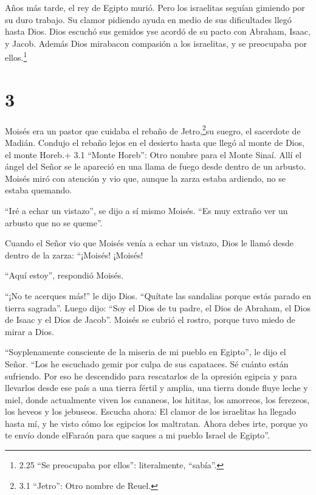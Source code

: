  Años más tarde, el rey de Egipto murió. Pero los
israelitas seguían gimiendo por su duro trabajo. Su clamor pidiendo
ayuda en medio de sus dificultades llegó hasta Dios.  Dios
escuchó sus gemidos yse acordó de su pacto con Abraham, Isaac, y Jacob.
 Además Dios mirabacon compasión a los israelitas, y se
preocupaba por ellos.\footnote{2.25 ``Se preocupaba por ellos'':
  literalmente, ``sabía''.}

\hypertarget{section-2}{%
\section{3}\label{section-2}}

 Moisés era un pastor que cuidaba el rebaño de
Jetro,\footnote{3.1 ``Jetro'': Otro nombre de Reuel.}su suegro, el
sacerdote de Madián. Condujo el rebaño lejos en el desierto hasta que
llegó al monte de Dios, el monte Horeb.+ 3.1 ``Monte Horeb'': Otro
nombre para el Monte Sinaí.  Allí el ángel del Señor se le
apareció en una llama de fuego desde dentro de un arbusto. Moisés miró
con atención y vio que, aunque la zarza estaba ardiendo, no se estaba
quemando.

 ``Iré a echar un vistazo'', se dijo a sí mismo Moisés. ``Es
muy extraño ver un arbusto que no se queme''.

 Cuando el Señor vio que Moisés venía a echar un vistazo,
Dios le llamó desde dentro de la zarza: ``¡Moisés! ¡Moisés!

``Aquí estoy'', respondió Moisés.

 ``¡No te acerques más!'' le dijo Dios. ``Quítate las
sandalias porque estás parado en tierra sagrada''.  Luego
dijo: ``Soy el Dios de tu padre, el Dios de Abraham, el Dios de Isaac y
el Dios de Jacob''. Moisés se cubrió el rostro, porque tuvo miedo de
mirar a Dios.

 ``Soyplenamente consciente de la miseria de mi pueblo en
Egipto'', le dijo el Señor. ``Los he escuchado gemir por culpa de sus
capataces. Sé cuánto están sufriendo.  Por eso he descendido
para rescatarlos de la opresión egipcia y para llevarlos desde ese país
a una tierra fértil y amplia, una tierra donde fluye leche y miel, donde
actualmente viven los cananeos, los hititas, los amorreos, los ferezeos,
los heveos y los jebuseos.  Escucha ahora: El clamor de los
israelitas ha llegado hasta mí, y he visto cómo los egipcios los
maltratan.  Ahora debes irte, porque yo te envío donde
elFaraón para que saques a mi pueblo Israel de Egipto''.

